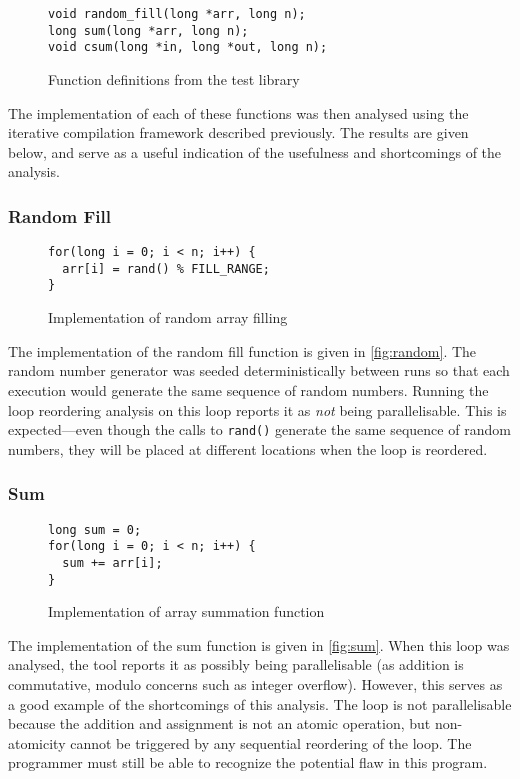 \documentclass[journal]{IEEEtran}
\begin{document}
\begin{figure}[h]
  \centering
  \begin{lstlisting}
void random_fill(long *arr, long n);
long sum(long *arr, long n);
void csum(long *in, long *out, long n);
  \end{lstlisting}
  \caption{Function definitions from the test library}
  \label{fig:header}
\end{figure}

The implementation of each of these functions was then analysed using the
iterative compilation framework described previously. The results are given
below, and serve as a useful indication of the usefulness and shortcomings of
the analysis.

\subsubsection{Random Fill}

\begin{figure}[h]
  \centering
  \begin{lstlisting}
for(long i = 0; i < n; i++) {
  arr[i] = rand() % FILL_RANGE;
}
  \end{lstlisting}
  \caption{Implementation of random array filling}
  \label{fig:random}
\end{figure}

The implementation of the random fill function is given in \autoref{fig:random}.
The random number generator was seeded deterministically between runs so that
each execution would generate the same sequence of random numbers. Running the
loop reordering analysis on this loop reports it as \emph{not} being
parallelisable. This is expected---even though the calls to \texttt{rand()}
generate the same sequence of random numbers, they will be placed at different
locations when the loop is reordered.

\subsubsection{Sum}

\begin{figure}[h]
  \centering
  \begin{lstlisting}
long sum = 0;
for(long i = 0; i < n; i++) {
  sum += arr[i];
}
  \end{lstlisting}
  \caption{Implementation of array summation function}
  \label{fig:sum}
\end{figure}

The implementation of the sum function is given in \autoref{fig:sum}. When this
loop was analysed, the tool reports it as possibly being parallelisable (as
addition is commutative, modulo concerns such as integer overflow). However,
this serves as a good example of the shortcomings of this analysis. The loop is
not parallelisable because the addition and assignment is not an atomic
operation, but non-atomicity cannot be triggered by any sequential reordering of
the loop. The programmer must still be able to recognize the potential flaw in
this program.
\end{document}
